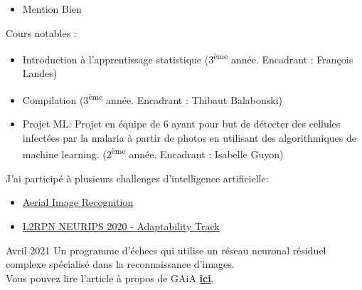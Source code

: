 \documentclass[10pt,a4paper,ragged2e,withhyper]{altacv}
\begin{document}
\begin{paracol}{2}
            \begin{itemize}
                \item Mention Bien
            \end{itemize}

            Cours notables :
            \vspace{2pt}
            \begin{itemize}
                \item Introduction à l'apprentissage statistique (3\textsuperscript{ème} année. Encadrant : François Landes)
                \item Compilation (3\textsuperscript{ème} année. Encadrant : Thibaut Balabonski)
                \item Projet ML: Projet en équipe de 6 ayant pour but de détecter des cellules infectées par la malaria à partir de photos
                      en utilisant des algorithmiques de machine learning.
                      (2\textsuperscript{ème} année. Encadrant : Isabelle Guyon)
            \end{itemize}
            

        \pagebreak
          J'ai participé à plusieurs challenges d'intelligence artificielle:
          \begin{itemize}
            \item \href{https://codalab.lisn.upsaclay.fr/competitions/573}{Aerial Image Recognition}
            \item \href{https://competitions.codalab.org/competitions/25427}{L2RPN NEURIPS 2020 - Adaptability Track}
          \end{itemize}

            {Avril 2021}{}
            Un programme d'échecs qui utilise un réseau neuronal résiduel complexe spécialisé dans la reconnaissance d'images.\\
            Vous pouvez lire l'article à propos de GAiA
            \href{https://raw.githubusercontent.com/Plagiat01/GAiA/master/article/Performing%20Regression%20on%20Complex%20Data.pdf}
            {\textbf{ici}}.\\
            \vspace{4pt}
            \\
            \vspace{4pt}
            \divider


\end{paracol}
\end{document}
